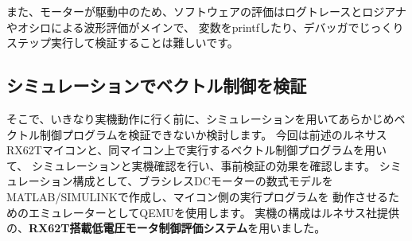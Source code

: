また、モーターが駆動中のため、ソフトウェアの評価はログトレースとロジアナやオシロによる波形評価がメインで、
変数をprintfしたり、デバッガでじっくりステップ実行して検証することは難しいです。

\subsection{シミュレーションでベクトル制御を検証}
そこで、いきなり実機動作に行く前に、シミュレーションを用いてあらかじめベクトル制御プログラムを検証できないか検討します。
今回は前述のルネサスRX62Tマイコンと、同マイコン上で実行するベクトル制御プログラムを用いて、
シミュレーションと実機確認を行い、事前検証の効果を確認します。
シミュレーション構成として、ブラシレスDCモーターの数式モデルをMATLAB/SIMULINKで作成し、マイコン側の実行プログラムを
動作させるためのエミュレーターとしてQEMUを使用します。
実機の構成はルネサス社提供の、{\bf RX62T搭載低電圧モータ制御評価システム}を用いました。

\newpage
